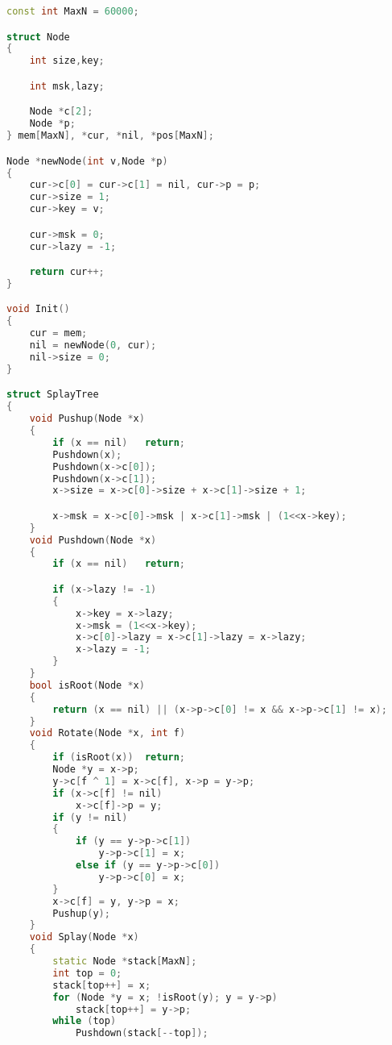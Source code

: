         \begin{lstlisting}[language=c++]
const int MaxN = 60000;

struct Node
{
    int size,key;

    int msk,lazy;

    Node *c[2];
    Node *p;
} mem[MaxN], *cur, *nil, *pos[MaxN];

Node *newNode(int v,Node *p)
{
    cur->c[0] = cur->c[1] = nil, cur->p = p;
    cur->size = 1;
    cur->key = v;

    cur->msk = 0;
    cur->lazy = -1;

    return cur++;
}

void Init()
{
    cur = mem;
    nil = newNode(0, cur);
    nil->size = 0;
}

struct SplayTree
{
    void Pushup(Node *x)
    {
        if (x == nil)	return;
        Pushdown(x);
        Pushdown(x->c[0]);
        Pushdown(x->c[1]);
        x->size = x->c[0]->size + x->c[1]->size + 1;

        x->msk = x->c[0]->msk | x->c[1]->msk | (1<<x->key);
    }
    void Pushdown(Node *x)
    {
        if (x == nil)	return;

        if (x->lazy != -1)
        {
            x->key = x->lazy;
            x->msk = (1<<x->key);
            x->c[0]->lazy = x->c[1]->lazy = x->lazy;
            x->lazy = -1;
        }
    }
    bool isRoot(Node *x)
    {
        return (x == nil) || (x->p->c[0] != x && x->p->c[1] != x);
    }
    void Rotate(Node *x, int f)
    {
        if (isRoot(x))	return;
        Node *y = x->p;
        y->c[f ^ 1] = x->c[f], x->p = y->p;
        if (x->c[f] != nil)
            x->c[f]->p = y;
        if (y != nil)
        {
            if (y == y->p->c[1])
                y->p->c[1] = x;
            else if (y == y->p->c[0])
                y->p->c[0] = x;
        }
        x->c[f] = y, y->p = x;
        Pushup(y);
    }
    void Splay(Node *x)
    {
        static Node *stack[MaxN];
        int top = 0;
        stack[top++] = x;
        for (Node *y = x; !isRoot(y); y = y->p)
            stack[top++] = y->p;
        while (top)
            Pushdown(stack[--top]);


\end{lstlisting}
